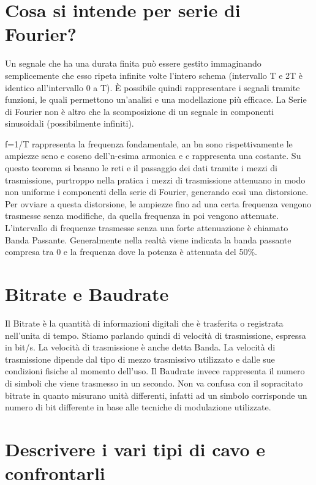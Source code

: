 \section{Cosa si intende per serie di Fourier?}
Un segnale che ha una durata finita può essere gestito immaginando semplicemente che esso ripeta infinite volte l’intero schema (intervallo T e 2T è identico all’intervallo 0 a T).
È possibile quindi rappresentare i segnali tramite funzioni, le quali permettono un’analisi e una modellazione più efficace.
La Serie di Fourier non è altro che la scomposizione di un segnale in componenti sinusoidali (possibilmente infiniti).
 
f=1/T rappresenta la frequenza fondamentale, an  bn  sono rispettivamente le ampiezze seno e coseno dell’n-esima armonica e c rappresenta una costante.
	Su questo teorema si basano le reti e il passaggio dei dati tramite i mezzi di trasmissione, purtroppo 	nella pratica i mezzi di trasmissione attenuano in modo non uniforme i componenti della serie di 	Fourier, generando così una distorsione. Per ovviare a questa distorsione, le ampiezze fino ad una 	certa frequenza vengono trasmesse senza modifiche, da quella frequenza in poi vengono attenuate.
	L’intervallo di frequenze trasmesse senza una forte attenuazione è chiamato Banda Passante.
Generalmente nella realtà viene indicata la banda passante compresa tra 0 e la frequenza dove la potenza è attenuata del 50\%.
\section{Bitrate e Baudrate}

Il Bitrate è la quantità di informazioni digitali che è trasferita o registrata nell’unita di tempo.
Stiamo parlando quindi di velocità di trasmissione, espressa in bit/s. La velocità di trasmissione è anche detta Banda. La velocità di trasmissione dipende dal tipo di mezzo trasmissivo utilizzato e dalle sue condizioni fisiche al momento dell’uso.
Il Baudrate invece rappresenta il numero di simboli che viene trasmesso in un secondo. Non va confusa con il sopracitato bitrate in quanto misurano unità differenti, infatti ad un simbolo corrisponde un numero di bit differente in base alle tecniche di modulazione utilizzate.

\section{Descrivere i vari tipi di cavo e confrontarli}

